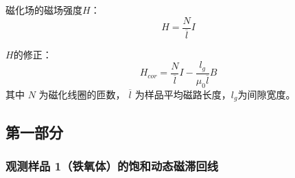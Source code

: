 \documentclass[11pt]{article}
\begin{document}
	磁化场的磁场强度$H$：
	\begin{equation*}
		H = \frac{N}{\overline{l}}I
	\end{equation*}
	
	$H$的修正：
	\begin{equation*}
		H_{cor} = \frac{N}{\overline{l}}I-\frac{l_g}{\mu_0\overline{l}}B
	\end{equation*}
	其中 $N$ 为磁化线圈的匝数， $\overline{l}$ 为样品平均磁路长度，$l_g$为间隙宽度。
	
	\subsection{第一部分}
	
	\subsubsection{观测样品 1（铁氧体）的饱和动态磁滞回线}
\end{document}
